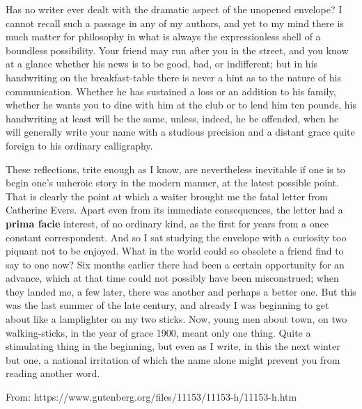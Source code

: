 \begin{linenumbers}
\modulolinenumbers[5] 
\indent Has no writer ever dealt with the dramatic aspect of the unopened envelope? I cannot recall such a passage in any of my authors, and yet to my mind there is much matter for philosophy in what is always the expressionless shell of a boundless possibility. Your friend may run after you in the street, and you know at a glance whether his news is to be good, bad, or indifferent; but in his handwriting on the breakfast-table there is never a hint as to the nature of his communication. Whether he has sustained a loss or an addition to his family, whether he wants you to dine with him at the club or to lend him ten pounds, his handwriting at least will be the same, unless, indeed, he be offended, when he will generally write your name with a studious precision and a distant grace quite foreign to his ordinary calligraphy.

\indent These reflections, trite enough as I know, are nevertheless inevitable if one is to begin one's unheroic story in the modern manner, at the latest possible point. That is clearly the point at which a waiter brought me the fatal letter from Catherine Evers. Apart even from its immediate consequences, the letter had a \textbf{prima facie} interest, of no ordinary kind, as the first for years from a once constant correspondent. And so I sat studying the envelope with a curiosity too piquant not to be enjoyed. What in the world could so obsolete a friend find to say to one now? Six months earlier there had been a certain opportunity for an advance, which at that time could not possibly have been misconstrued; when they landed me, a few later, there was another and perhaps a better one. But this was the last summer of the late century, and already I was beginning to get about like a lamplighter on my two sticks. Now, young men about town, on two walking-sticks, in the year of grace 1900, meant only one thing. Quite a stimulating thing in the beginning, but even as I write, in this the next winter but one, a national irritation of which the name alone might prevent you from reading another word.
\end{linenumbers}

From: https://www.gutenberg.org/files/11153/11153-h/11153-h.htm

